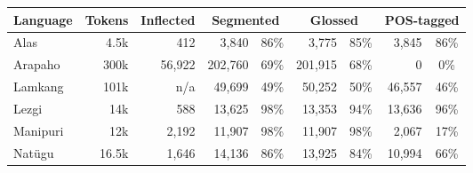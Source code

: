 \begin{table}[tb]
    \centering
    \begin{tabular}{l|r|r|rc|rc|rc}
         \textbf{Language} & \textbf{Tokens} & \textbf{Inflected} & \multicolumn{2}{c|}{\textbf{Segmented}} & \multicolumn{2}{c|}{\textbf{Glossed}} & \multicolumn{2}{c}{\textbf{POS-tagged}} \\
         \hline
         Alas & 4.5k  & 412 & 3,840 & 86\% & 3,775 & 85\% & 3,845  & 86\% \\
         \hline
         Arapaho & 300k &  56,922 & 202,760 & 69\%  & 201,915 & 68\% & 0  & 0\%  \\
         \hline
         Lamkang & 101k & n/a & 49,699 & 49\%  & 50,252 & 50\% & 46,557 & 46\% \\
         \hline
         Lezgi & 14k & 588 & 13,625  & 98\%  & 13,353  &  94\% & 13,636 & 96\%  \\
         \hline
         Manipuri & 12k  & 2,192 & 11,907 & 98\%  & 11,907 & 98\% & 2,067 & 17\% \\
         \hline
         Natügu & 16.5k & 1,646 & 14,136 & 86\%  & 13,925 &  84\% & 10,994 & 66\% \\

\end{tabular}
\end{table}
